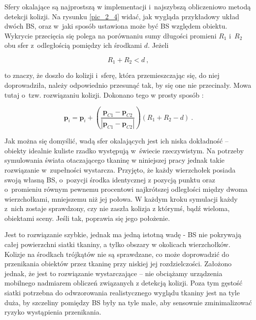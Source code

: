 				
				Sfery okalające są najprostszą w implementacji i~najszybszą obliczeniowo metodą detekcji kolizji. Na rysunku \ref{pic_2_4} widać, jak wygląda przykładowy układ dwóch BS, oraz w~jaki sposób ustawiona może być BS względem obiektu. Wykrycie przecięcia się polega na porównaniu sumy długości promieni \(R_{1}\) i~\(R_{2}\) obu sfer z~odległością pomiędzy ich środkami \(d\). Jeżeli
				
				\begin{equation}
				R_{1} + R_{2} < d \ ,
				\end{equation}
				
				to znaczy, że doszło do kolizji i~sferę, która przemieszczając się, do niej doprowadziła, należy odpowiednio przesunąć tak, by się one nie przecinały. Mowa tutaj o~tzw. rozwiązaniu kolizji. Dokonano tego w prosty sposób \cite{wzory_sfera}:
				
				\begin{equation}
				\mathbf{p}_{i} = \mathbf{p}_{i} + (\frac{\mathbf{p}_{C1} - \mathbf{p}_{C2}}{|\mathbf{p}_{C1} - \mathbf{p}_{C2}|})(R_{1} + R_{2} - d) \ .
				\end{equation}
				
				Jak można się domyślić, wadą sfer okalających jest ich niska dokładność -- obiekty idealnie kuliste rzadko występują w~świecie rzeczywistym. Na potrzeby symulowania świata otaczającego tkaninę w niniejszej pracy jednak takie rozwiązanie w~zupełności wystarcza. Przyjęto, że każdy wierzchołek posiada swoją własną BS, o~pozycji środka identycznej z pozycją punktu oraz o~promieniu równym pewnemu procentowi najkrótszej odległości między dwoma wierzchołkami, mniejszemu niż jej połowa. W każdym kroku symulacji każdy z~nich zostaje sprawdzony, czy nie zaszła kolizja z którymś, bądź wieloma, obiektami sceny. Jeśli tak, poprawia się jego położenie. 
				
				Jest to rozwiązanie szybkie, jednak ma jedną istotną wadę - BS nie pokrywają całej powierzchni siatki tkaniny, a tylko obszary w okolicach wierzchołków. Kolizje na środkach trójkątów nie są sprawdzane, co może doprowadzić do przenikania obiektów przez tkaninę przy niskiej jej rozdzielczości. Założono jednak, że jest to rozwiązanie wystarczające -- nie obciążamy urządzenia mobilnego nadmiarem obliczeń związanych z detekcją kolizji. Poza tym gęstość siatki potrzebna do odwzorowania realistycznego wyglądu tkaniny jest na tyle duża, by szczeliny pomiędzy BS były na tyle małe, aby sensownie zminimalizować ryzyko wystąpienia przenikania.
				
